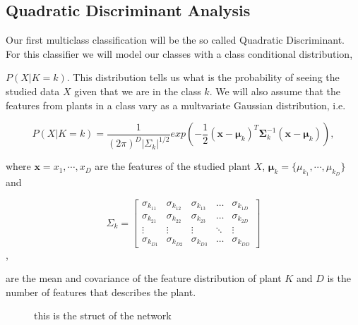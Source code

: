 \subsection{Quadratic Discriminant Analysis}

Our first multiclass classification will be the so called Quadratic Discriminant. For this classifier we will model our classes with a class conditional distribution,

$P(X|K=k)$. This distribution tells us what is the probability of seeing the studied data $X$ given that we are in the class $k$. We will also assume that the features from plants in a class vary as a multvariate Gaussian distribution, i.e.


\begin{equation}
P(X|K=k)=\frac{1}{(2\pi)^D|\Sigma_k|^{1/2}}exp\left(-\frac{1}{2}(\bm{x}-\bm{\mu}_k)^{T}\bm{\Sigma}^{-1}_k(\bm{x}-\bm{\mu}_k)\right),
\end{equation}

where $\bm{x}={x_1,\cdots,x_{D}}$ are the features of the studied plant $X$, $\bm{\mu}_k=\{\mu_{k_1},\cdots,\mu_{k_{D}}\}$ and


\[
\Sigma_{k}=
\begin{bmatrix}
    \sigma_{k_{11}} & \sigma_{k_{12}} & \sigma_{k_{13}} & \dots  & \sigma_{k_{1D}} \\
    \sigma_{k_{21}} & \sigma_{k_{22}} & \sigma_{k_{23}} & \dots  & \sigma_{k_{2D}} \\
    \vdots & \vdots & \vdots & \ddots & \vdots \\
    \sigma_{k_{D1}} & \sigma_{k_{D2}} & \sigma_{k_{D3}} & \dots  & \sigma_{k_{DD}}
\end{bmatrix}\],

are the mean and covariance of the feature distribution of plant $K$ and $D$ is the number of features that describes the plant.


\begin{figure}
\centering

\caption{\label{fig:networkStruct}this is the struct of the network}
\end{figure}
